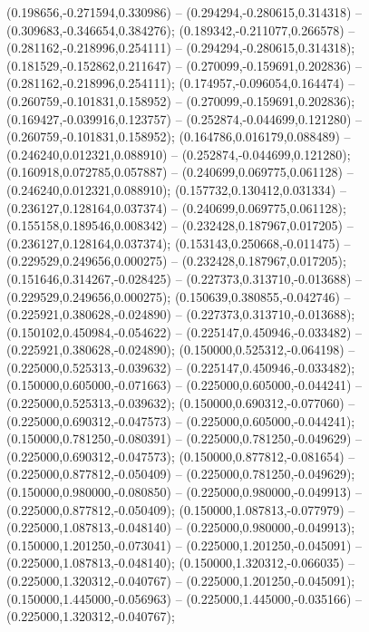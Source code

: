  (0.198656,-0.271594,0.330986) -- (0.294294,-0.280615,0.314318) -- (0.309683,-0.346654,0.384276);
 (0.189342,-0.211077,0.266578) -- (0.281162,-0.218996,0.254111) -- (0.294294,-0.280615,0.314318);
 (0.181529,-0.152862,0.211647) -- (0.270099,-0.159691,0.202836) -- (0.281162,-0.218996,0.254111);
 (0.174957,-0.096054,0.164474) -- (0.260759,-0.101831,0.158952) -- (0.270099,-0.159691,0.202836);
 (0.169427,-0.039916,0.123757) -- (0.252874,-0.044699,0.121280) -- (0.260759,-0.101831,0.158952);
 (0.164786,0.016179,0.088489) -- (0.246240,0.012321,0.088910) -- (0.252874,-0.044699,0.121280);
 (0.160918,0.072785,0.057887) -- (0.240699,0.069775,0.061128) -- (0.246240,0.012321,0.088910);
 (0.157732,0.130412,0.031334) -- (0.236127,0.128164,0.037374) -- (0.240699,0.069775,0.061128);
 (0.155158,0.189546,0.008342) -- (0.232428,0.187967,0.017205) -- (0.236127,0.128164,0.037374);
 (0.153143,0.250668,-0.011475) -- (0.229529,0.249656,0.000275) -- (0.232428,0.187967,0.017205);
 (0.151646,0.314267,-0.028425) -- (0.227373,0.313710,-0.013688) -- (0.229529,0.249656,0.000275);
 (0.150639,0.380855,-0.042746) -- (0.225921,0.380628,-0.024890) -- (0.227373,0.313710,-0.013688);
 (0.150102,0.450984,-0.054622) -- (0.225147,0.450946,-0.033482) -- (0.225921,0.380628,-0.024890);
 (0.150000,0.525312,-0.064198) -- (0.225000,0.525313,-0.039632) -- (0.225147,0.450946,-0.033482);
 (0.150000,0.605000,-0.071663) -- (0.225000,0.605000,-0.044241) -- (0.225000,0.525313,-0.039632);
 (0.150000,0.690312,-0.077060) -- (0.225000,0.690312,-0.047573) -- (0.225000,0.605000,-0.044241);
 (0.150000,0.781250,-0.080391) -- (0.225000,0.781250,-0.049629) -- (0.225000,0.690312,-0.047573);
 (0.150000,0.877812,-0.081654) -- (0.225000,0.877812,-0.050409) -- (0.225000,0.781250,-0.049629);
 (0.150000,0.980000,-0.080850) -- (0.225000,0.980000,-0.049913) -- (0.225000,0.877812,-0.050409);
 (0.150000,1.087813,-0.077979) -- (0.225000,1.087813,-0.048140) -- (0.225000,0.980000,-0.049913);
 (0.150000,1.201250,-0.073041) -- (0.225000,1.201250,-0.045091) -- (0.225000,1.087813,-0.048140);
 (0.150000,1.320312,-0.066035) -- (0.225000,1.320312,-0.040767) -- (0.225000,1.201250,-0.045091);
 (0.150000,1.445000,-0.056963) -- (0.225000,1.445000,-0.035166) -- (0.225000,1.320312,-0.040767);

